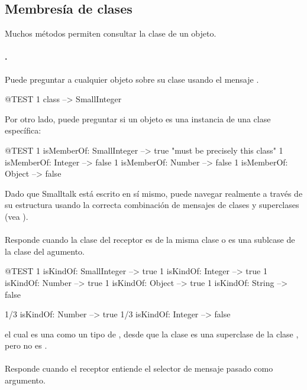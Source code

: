 \documentclass[a4paper,10pt,twoside]{book}
\begin{document}
\subsection{Membres\'ia de clases}
Muchos m\'etodos permiten consultar la clase de un objeto.

\paragraph{.} Puede preguntar a cualquier objeto sobre su clase usando el mensaje .
\begin{code}{@TEST}
1 class --> SmallInteger
\end{code}

Por otro lado, puede preguntar si un objeto es una instancia de una clase espec\'ifica:
\begin{code}{@TEST}
1 isMemberOf: SmallInteger --> true    "must be precisely this class"
1 isMemberOf: Integer          --> false
1 isMemberOf: Number        --> false
1 isMemberOf: Object           --> false
\end{code}

Dado que Smalltalk est\'a escrito en s\'i mismo, puede navegar realmente a trav\'es de su estructura usando la correcta combinaci\'on de mensajes de clases y superclases (vea ). 

\paragraph{}
 Responde cuando la clase del receptor es de la misma clase o es una sublcase de la clase del agumento.

\begin{code}{@TEST}
1 isKindOf: SmallInteger --> true
1 isKindOf: Integer          --> true
1 isKindOf: Number         --> true
1 isKindOf: Object           --> true
1 isKindOf: String            --> false

1/3 isKindOf: Number      --> true
1/3 isKindOf: Integer        --> false
\end{code}

 el cual es una   como un tipo de , desde que la clase  es una superclase de la clase , pero   no es .

\paragraph{}
 Responde cuando el receptor entiende el selector de mensaje pasado como argumento.
\end{document}
